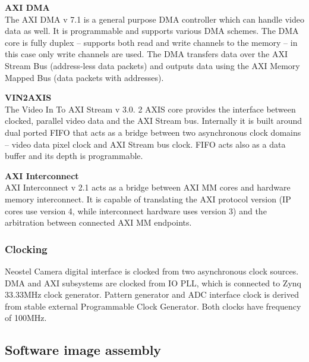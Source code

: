 \begin{description}

\item \textbf{AXI DMA} \hfill \\
The AXI DMA v 7.1 is a general purpose DMA controller which can handle video data as well. It is programmable and supports various DMA schemes. The DMA core is fully duplex – supports both read and write channels to the memory – in this case only write channels are used. The DMA transfers data over the AXI Stream Bus (address-less data packets) and outputs data using the AXI Memory Mapped Bus (data packets with addresses).
\item \textbf{VIN2AXIS} \hfill \\
The Video In To AXI Stream v 3.0. 2 AXIS core provides the interface between clocked, parallel video data and the AXI Stream bus. Internally it is built around dual ported FIFO that acts as a bridge between two asynchronous clock domains – video data pixel clock and AXI Stream bus clock. FIFO acts also as a data buffer and its depth is programmable.
\item \textbf{AXI Interconnect} \hfill \\
AXI Interconnect v 2.1 acts as a bridge between AXI MM cores and hardware memory interconnect. It is capable of translating the AXI protocol version (IP cores use version 4, while interconnect hardware uses version 3) and the arbitration between connected AXI MM endpoints.

\end{description}

\subsubsection{Clocking}
Neostel Camera digital interface is clocked from two asynchronous clock sources. DMA and AXI subsystems are clocked from IO PLL, which is connected to Zynq 33.33MHz clock generator. Pattern generator and ADC interface clock is derived from stable external Programmable Clock Generator. Both clocks have frequency of 100MHz.

\subsection{Software image assembly}


